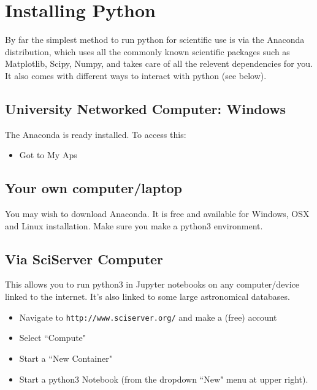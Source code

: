 \documentclass[%
 reprint,
 amsmath,amssymb,
 aps,
]{revtex4-1}
\begin{document}

\section{Installing Python \label{sec:install}} 

By far the simplest method to run python for scientific use is via the Anaconda distribution, which uses all the commonly known scientific packages such as Matplotlib, Scipy, Numpy, and takes care of all the relevent dependencies for you. It also comes with different ways to interact with python (see below). 

\subsection{University Networked Computer: Windows}
The Anaconda is ready installed. To access this: 
\begin{itemize}
\item Got to My Aps
\end{itemize}

\subsection{Your own computer/laptop}

You may wish to download Anaconda. It is free and available for Windows, OSX and Linux installation. Make sure you make a python3 environment. 

\subsection{Via SciServer Computer}
This allows you to run python3 in Jupyter notebooks on any computer/device linked to the internet. It's also linked to some large astronomical databases. 
\begin{itemize}
\item Navigate to {\tt http://www.sciserver.org/} and make a (free) account
\item Select ``Compute"
\item Start a ``New Container"
\item Start a python3 Notebook (from the dropdown ``New" menu at upper right).
\end{itemize}
\end{document}
